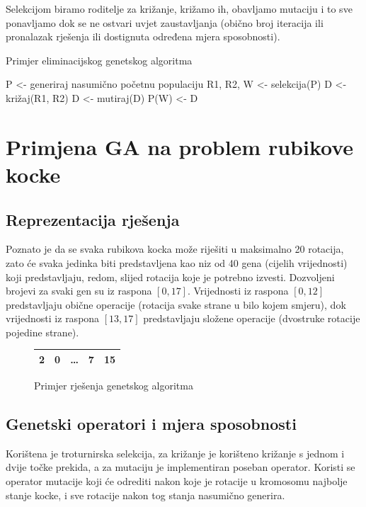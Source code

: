 \documentclass[times, utf8, seminar, numeric]{fer}
\begin{document}
Selekcijom biramo roditelje za križanje, križamo ih, obavljamo mutaciju i to sve ponavljamo dok se ne ostvari uvjet zaustavljanja (obično broj iteracija ili pronalazak rješenja ili dostignuta određena mjera sposobnosti).

\begin{algorithm}
\begin{algorithmic}[1]
\renewcommand{\algorithmicwhile}{\textbf{dok}}
\renewcommand{\algorithmicdo}{\textbf{radi}}

\caption{Primjer eliminacijskog genetskog algoritma}

\State P <- generiraj nasumično početnu populaciju
	\State R1, R2, W <- selekcija(P) 
	\State D <- križaj(R1, R2) 
	\State D <- mutiraj(D)
	\State P(W) <- D 
\EndWhile
\end{algorithmic}
\end{algorithm}

\section{Primjena GA na problem rubikove kocke}

\subsection{Reprezentacija rješenja}
Poznato je da se svaka rubikova kocka može riješiti u maksimalno 20 rotacija, zato će svaka jedinka biti predstavljena kao niz od 40 gena (cijelih vrijednosti) koji predstavljaju, redom, slijed rotacija koje je potrebno izvesti. Dozvoljeni brojevi za svaki gen su iz raspona $[0, 17]$.
Vrijednosti iz raspona $[0, 12]$ predstavljaju obične operacije (rotacija svake strane u bilo kojem smjeru), dok vrijednosti iz raspona $[13, 17]$ predstavljaju složene operacije (dvostruke rotacije pojedine strane).

\begin{figure}
\centering
\begin{tabular}{|c|c|c|c|c|}\hline
2 & 0 & \dots & 7 & 15\\\hline
\end{tabular}
\caption{Primjer rješenja genetskog algoritma}

\end{figure}

\subsection{Genetski operatori i mjera sposobnosti}
Korištena je troturnirska selekcija, za križanje je korišteno križanje s jednom i dvije točke prekida, a za mutaciju je implementiran poseban operator.
Koristi se operator mutacije koji će odrediti nakon koje je rotacije u kromosomu najbolje stanje kocke, i sve rotacije nakon tog stanja nasumično generira.
\end{document}
